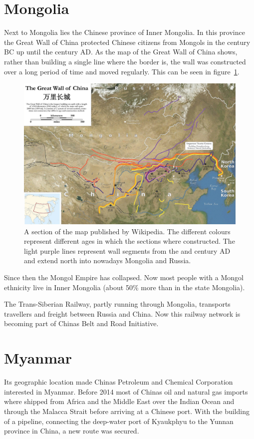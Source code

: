 \documentclass[conference]{IEEEtran}
\begin{document}
	\section{Mongolia}
	Next to Mongolia lies the Chinese province of Inner Mongolia. In this province the Great Wall of China protected Chinese citizens from Mongols in the  century BC up until the  century AD\cite{worldAtlas_whyWasTheGreatWallOfChinaBuilt}. As the map of the Great Wall of China shows, rather than building a single line where the border is, the wall was constructed over a long period of time and moved regularly. This can be seen in figure~\ref{pic:mongolia_greatWallOfChina}.
	
	\begin{figure}[t]
		\centering
		\includegraphics[width=\linewidth]{img/mongolia_greatWallOfChina.png}
		\caption{A section of the map published by Wikipedia\cite{wp_greatWallOfChina}. The different colours represent different ages in which the sections where constructed. The light purple lines represent wall segments from the  and  century AD and extend north into nowadays Mongolia and Russia.}
		\label{pic:mongolia_greatWallOfChina}
	\end{figure}

	Since then the Mongol Empire has collapsed. Now most people with a Mongol ethnicity live in Inner Mongolia (about 50\% more than in the state Mongolia).
	
	The Trans-Siberian Railway, partly running through Mongolia, transports travellers and freight between Russia and China. Now this railway network is becoming part of Chinas Belt and Road Initiative.
	
	\section{Myanmar}
	Its geographic location made Chinas Petroleum and Chemical Corporation interested in Myanmar. Before 2014 most of Chinas oil and natural gas imports where shipped from Africa and the Middle East over the Indian Ocean and through the Malacca Strait before arriving at a Chinese port. With the building of a pipeline, connecting the deep-water port of Kyaukphyu to the Yunnan province in China, a new route was secured\cite{chinaDaily_oilStartsFlowingThroughChinaMyanmarPipeline}.
	
\end{document}
